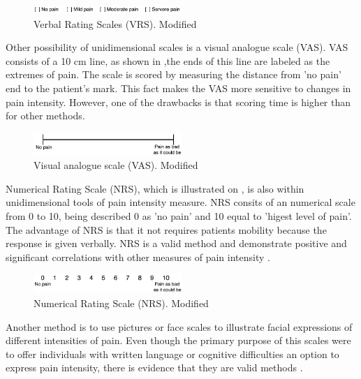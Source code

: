 \begin{figure}[H]
	\includegraphics[width=0.5\textwidth]{figures/VRS.png} 
	\caption{Verbal Rating Scales (VRS). Modified~\cite{Jensen2001}}
	\label{fig:VRS}  
\end{figure}   

Other possibility of unidimensional scales is a visual analogue scale (VAS). VAS consists of a 10 cm line, as shown in ,the ends of this line are labeled as the extremes of pain. The scale is scored by measuring the distance from 'no pain' end to the patient's mark. This fact makes the VAS more sensitive to changes in pain intensity. However, one of the drawbacks is that scoring time is higher than for other methods. 

\begin{figure}[H]
	\includegraphics[width=0.5\textwidth]{figures/VAS.png} 
	\caption{Visual analogue scale (VAS). Modified~\cite{Jensen2001}}
	\label{fig:VAS}  
\end{figure}   

Numerical Rating Scale (NRS), which is illustrated on , is also within unidimensional tools of pain intensity measure. NRS consits of an numerical scale from 0 to 10, being described 0 as 'no pain' and  10 equal to 'higest level of pain'. The advantage of NRS is that it not requires patients mobility because the response is given verbally. NRS is a valid method and demonstrate positive and significant correlations with other measures of pain intensity \cite{Jensen1986}. 

\begin{figure}[H]
	\includegraphics[width=0.5\textwidth]{figures/NRS.png} 
	\caption{Numerical Rating Scale (NRS). Modified~\cite{Jensen2001}}
	\label{fig:NRS}  
\end{figure}   


Another method is to use pictures or face scales to illustrate facial expressions of different intensities of pain. Even though the primary purpose of this scales were to offer individuals with written language or cognitive difficulties an option to express pain intensity, there is evidence that they are valid methods \cite{Jensen2001}. 

